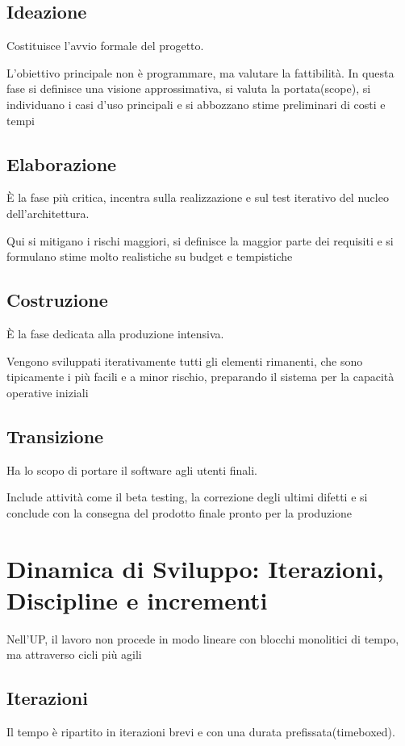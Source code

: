 \subsection{Ideazione}
Costituisce l'avvio formale del progetto.

L'obiettivo principale non è programmare, ma valutare la fattibilità. In questa fase si definisce una visione approssimativa, si valuta la portata(scope), si individuano i casi d'uso principali e si abbozzano stime preliminari di costi e tempi

\subsection{Elaborazione}
È la fase più critica, incentra sulla realizzazione e sul test iterativo del nucleo dell'architettura.

Qui si mitigano i rischi maggiori, si definisce la maggior parte dei requisiti e si formulano stime molto realistiche su budget e tempistiche

\subsection{Costruzione}
È la fase dedicata alla produzione intensiva.

Vengono sviluppati iterativamente tutti gli elementi rimanenti, che sono tipicamente i più facili e a minor rischio, preparando il sistema per la capacità operative iniziali

\subsection{Transizione}
Ha lo scopo di portare il software agli utenti finali.

Include attività come il beta testing, la correzione degli ultimi difetti e si conclude con la consegna del prodotto finale pronto per la produzione

\section{Dinamica di Sviluppo: Iterazioni, Discipline e incrementi}
Nell'UP, il lavoro non procede in modo lineare con blocchi monolitici di tempo, ma attraverso cicli più agili

\subsection{Iterazioni}
Il tempo è ripartito in iterazioni brevi e con una durata prefissata(timeboxed).

